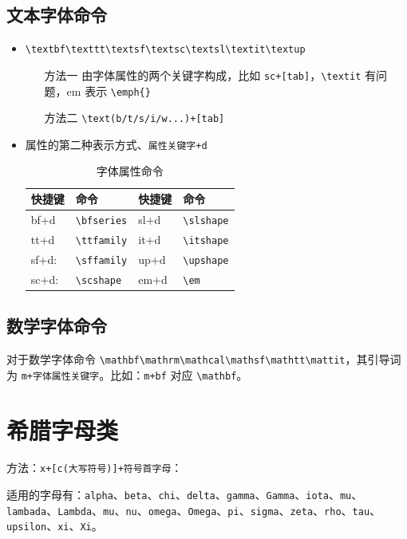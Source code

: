 \documentclass[geye,green,pad,cn]{elegantnote}
\begin{document}
\subsection{文本字体命令}

\begin{itemize}
\item \lstinline|\textbf\texttt\textsf\textsc\textsl\textit\textup|
\begin{itemize}
\item[方法一] 由字体属性的两个关键字构成，比如 \lstinline{sc+[tab]}，\lstinline{\textit} 有问题，em 表示 \lstinline|\emph{}|
\item[方法二] \lstinline{\text(b/t/s/i/w...)+[tab]}
\end{itemize}
\item 属性的第二种表示方式、\lstinline{属性关键字+d}
\begin{table}[htbp]
  \centering
  \caption{字体属性命令}
    \begin{tabular}{llll}
    \toprule
    快捷键   & 命令    & 快捷键 & 命令 \\
    \midrule
    bf+d   & \lstinline|\bfseries| & sl+d & \lstinline|\slshape| \\
    tt+d & \lstinline|\ttfamily| & it+d & \lstinline|\itshape| \\
    sf+d:  & \lstinline|\sffamily| & up+d & \lstinline|\upshape| \\
    sc+d:  & \lstinline|\scshape| & em+d & \lstinline|\em| \\
    \bottomrule
    \end{tabular}%
  \label{tab:greek}%
\end{table}%
\end{itemize}

\subsection{数学字体命令}

对于数学字体命令 \lstinline{\mathbf\mathrm\mathcal\mathsf\mathtt\mattit}，其引导词为 \lstinline{m+字体属性关键字}。比如：\lstinline{m+bf} 对应 \lstinline{\mathbf}。
    
\section{希腊字母类}
方法：\lstinline|x+[c(大写符号)]+符号首字母|：

适用的字母有：\lstinline|alpha|、\lstinline|beta|、\lstinline|chi|、\lstinline|delta|、\lstinline|gamma|、\lstinline|Gamma|、\lstinline|iota|、\lstinline|mu|、\lstinline|lambada|、\lstinline|Lambda|、\lstinline|mu|、\lstinline|nu|、\lstinline|omega|、\lstinline|Omega|、\lstinline|pi|、\lstinline|sigma|、\lstinline|zeta|、\lstinline|rho|、\lstinline|tau|、\lstinline|upsilon|、\lstinline|xi|、\lstinline|Xi|。
\end{document}
